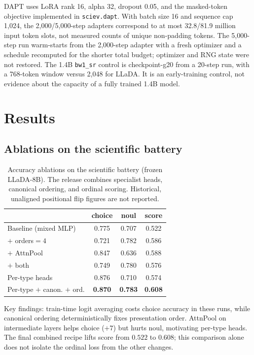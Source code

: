 \documentclass[11pt]{article}
\begin{document}
DAPT uses LoRA rank 16, alpha 32, dropout 0.05, and the masked-token
objective implemented in \texttt{sciev.dapt}. With batch size 16
and sequence cap 1{,}024, the 2{,}000/5{,}000-step adapters correspond to
at most 32.8/81.9 million input token slots, not measured counts of unique
non-padding tokens. The 5{,}000-step run warm-starts from the
2{,}000-step adapter with a fresh optimizer and a schedule recomputed for
the shorter total budget; optimizer and RNG state were not restored.
The 1.4B \texttt{bw1\_sr} control is checkpoint-g20 from a 20-step run,
with a 768-token window versus 2{,}048 for LLaDA. It is an early-training
control, not evidence about the capacity of a fully trained 1.4B model.

\section{Results}
\subsection{Ablations on the scientific battery}
\begin{table}[htbp]
\centering\small
\begin{tabular}{lccc}
\toprule
 & choice & noul & score \\
\midrule
Baseline (mixed MLP)        & 0.775 & 0.707 & 0.522 \\
$+$ orders$=4$              & 0.721 & 0.782 & 0.586 \\
$+$ AttnPool                & 0.847 & 0.636 & 0.588 \\
$+$ both                    & 0.749 & 0.780 & 0.576 \\
\midrule
Per-type heads              & 0.876 & 0.710 & 0.574 \\
Per-type $+$ canon. $+$ ord. & \textbf{0.870} & \textbf{0.783} & \textbf{0.608} \\
\bottomrule
\end{tabular}
\caption{Accuracy ablations on the scientific battery (frozen LLaDA-8B).
The release combines specialist heads, canonical ordering, and ordinal
scoring. Historical, unaligned positional flip figures are not reported.}
\end{table}

Key findings: train-time logit averaging costs choice accuracy in these
runs, while canonical ordering deterministically fixes presentation order.
AttnPool on intermediate layers helps choice ($+7$) but hurts noul,
motivating per-type heads. The final combined recipe lifts score from
$0.522$ to $0.608$; this comparison alone does not isolate the ordinal
loss from the other changes.
\end{document}

